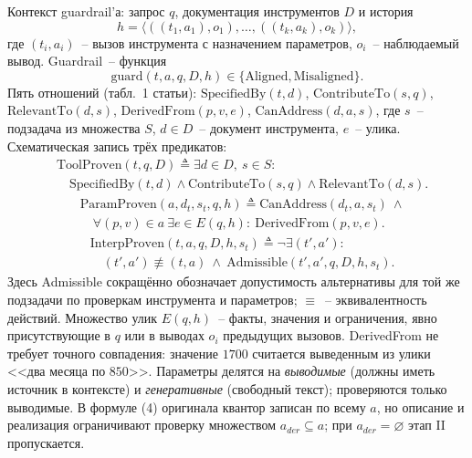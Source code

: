 Контекст guardrail'а: запрос $q$, документация инструментов $D$ и история
\begin{equation}
h = \langle ((t_1,a_1),o_1), \dots, ((t_k,a_k),o_k) \rangle,
\end{equation}
где $(t_i,a_i)$~-- вызов инструмента с назначением параметров, $o_i$~-- наблюдаемый вывод.
Guardrail~-- функция
\begin{equation}
\mathrm{guard}(t,a,q,D,h) \in \{\text{Aligned}, \text{Misaligned}\}.
\end{equation}
Пять отношений (табл.~1 статьи): $\mathrm{SpecifiedBy}(t,d)$, $\mathrm{ContributeTo}(s,q)$,
$\mathrm{RelevantTo}(d,s)$, $\mathrm{DerivedFrom}(p,v,e)$, $\mathrm{CanAddress}(d,a,s)$,
где $s$~-- подзадача из множества $S$, $d\in D$~-- документ инструмента, $e$~-- улика.
Схематическая запись трёх предикатов:
\begin{equation}
\begin{aligned}
&\mathrm{ToolProven}(t,q,D)\triangleq \exists d\in D,\ s\in S:\\
&\quad\mathrm{SpecifiedBy}(t,d)\wedge\mathrm{ContributeTo}(s,q)\wedge\mathrm{RelevantTo}(d,s).
\end{aligned}
\end{equation}
\begin{equation}
\begin{aligned}
&\mathrm{ParamProven}(a,d_t,s_t,q,h)\triangleq \mathrm{CanAddress}(d_t,a,s_t)\ \wedge\\
&\quad\forall (p,v)\in a\ \exists e\in E(q,h):\ \mathrm{DerivedFrom}(p,v,e).
\end{aligned}
\end{equation}
\begin{equation}
\begin{aligned}
&\mathrm{InterpProven}(t,a,q,D,h,s_t)\triangleq \neg\exists (t',a'):\\
&\quad(t',a')\not\equiv(t,a)\ \wedge\ \mathrm{Admissible}(t',a',q,D,h,s_t).
\end{aligned}
\end{equation}
Здесь Admissible сокращённо обозначает допустимость альтернативы для той же подзадачи
по проверкам инструмента и параметров; $\equiv$~-- эквивалентность действий.
Множество улик $E(q,h)$~-- факты, значения и ограничения, явно присутствующие в $q$
или в выводах $o_i$ предыдущих вызовов. DerivedFrom не требует точного совпадения:
значение $1700$ считается выведенным из улики <<два месяца по $850$>>. Параметры делятся
на \emph{выводимые} (должны иметь источник в контексте) и \emph{генеративные} (свободный
текст); проверяются только выводимые. В формуле (4) оригинала квантор записан по всему $a$,
но описание и реализация ограничивают проверку множеством $a_{der}\subseteq a$;
при $a_{der}=\varnothing$ этап II пропускается.


